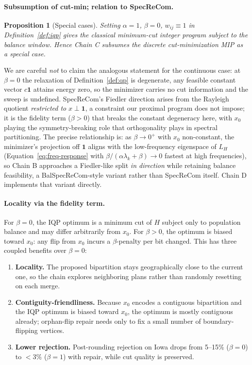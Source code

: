 \documentclass[11pt]{article}
\newtheorem{proposition}{Proposition}[section]
\begin{document}
\paragraph{Subsumption of cut-min; relation to SpecReCom.}\label{sec:iqp-subsumption}

\begin{proposition}[Special cases]\label{prop:iqp-special-cases}
Setting $\alpha = 1$, $\beta = 0$, $w_{ij} \equiv 1$ in
Definition~\ref{def:iqp} gives the classical minimum-cut integer
program subject to the balance window. Hence Chain C subsumes
the discrete cut-minimization MIP as a special case.
\end{proposition}

We are careful \emph{not} to claim the analogous statement for the
continuous case: at $\beta = 0$ the relaxation of
Definition~\ref{def:qp} is degenerate, any feasible constant vector
$c\mathbf{1}$ attains energy zero, so the minimizer carries no cut
information and the sweep is undefined. SpecReCom's Fiedler direction
arises from the Rayleigh quotient \emph{restricted to}
$x \perp \mathbf{1}$, a constraint our proximal program does not
impose; it is the fidelity term ($\beta > 0$) that breaks the constant
degeneracy here, with $x_0$ playing the symmetry-breaking role that
orthogonality plays in spectral partitioning. The precise relationship
is: as $\beta \to 0^+$ with $x_0$ non-constant, the minimizer's
projection off $\mathbf{1}$ aligns with the low-frequency eigenspace
of $L_H$ (Equation~\eqref{eq:freq-response} with
$\beta/(\alpha\lambda_k + \beta) \to 0$ fastest at high frequencies),
so Chain B approaches a Fiedler-like split \emph{in direction} while
retaining balance feasibility, a BalSpecReCom-style variant rather
than SpecReCom itself. Chain D implements that variant directly.

\paragraph{Locality via the fidelity term.}\label{sec:iqp-locality}

For $\beta = 0$, the IQP optimum is a minimum cut of $H$ subject only
to population balance and may differ arbitrarily from $x_0$. For
$\beta > 0$, the optimum is biased toward $x_0$: any flip from $x_0$
incurs a $\beta$-penalty per bit changed. This has three coupled
benefits over $\beta = 0$:

\begin{enumerate}
  \item \textbf{Locality.} The proposed bipartition stays geographically
    close to the current one, so the chain explores neighboring
    plans rather than randomly resetting on each merge.
  \item \textbf{Contiguity-friendliness.} Because $x_0$ encodes a
    contiguous bipartition and the IQP optimum is biased toward $x_0$,
    the optimum is mostly contiguous already; orphan-flip repair
    needs only to fix a small number of boundary-flipping vertices.
  \item \textbf{Lower rejection.} Post-rounding rejection on Iowa
    drops from 5--15\% ($\beta = 0$) to $<3\%$ ($\beta = 1$) with
    repair, while cut quality is preserved.
\end{enumerate}
\end{document}
